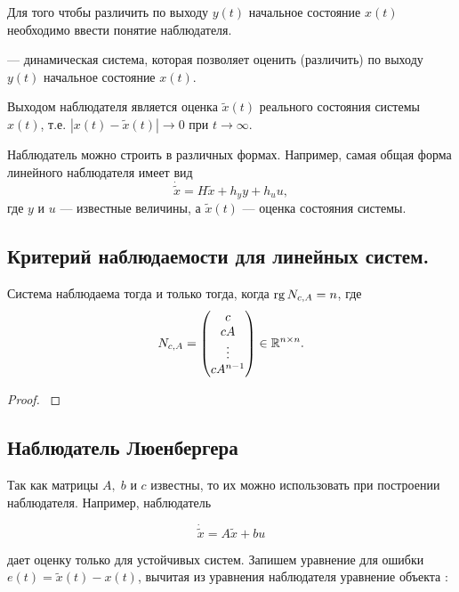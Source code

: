 \documentclass[../../TAU.tex]{subfiles}
\begin{document}
    Для того чтобы различить по выходу $y(t)$ начальное состояние $x(t)$ необходимо ввести понятие наблюдателя.

     --- динамическая система, которая позволяет оценить (различить) по выходу $y(t)$ начальное состояние $x(t)$.

    Выходом наблюдателя является оценка $\tilde x(t)$ реального состояния системы $x(t)$, т.е. $|x(t)-\tilde x(t)|\rightarrow 0$ при $t\rightarrow\infty$.

    Наблюдатель можно строить в различных формах. Например, самая общая форма линейного наблюдателя имеет вид
    $$
    \dot{\tilde x} = H\tilde x + h_y y + h_u u,
    $$
    где $y$ и $u$ --- известные величины, а $\tilde x (t)$ --- оценка состояния системы.

\subsection{Критерий наблюдаемости для линейных систем.}

    \begin{theor}
        Система  наблюдаема тогда и только тогда, когда $\mathop{\mathrm{rg}}\nolimits N_{c,A} = n$, где
        $$
            N_{c,A} =
            \begin{pmatrix}
                c\\
                cA\\
                \vdots\\
                cA^{n-1}
            \end{pmatrix}
            \in\mathbb{R}^{n\times n}.
        $$
    \end{theor}
    
    \begin{proof}
    \cite[стр. 315-318]{voron2}
    \end{proof}

\subsection{Наблюдатель Люенбергера}\cite{andr}

    Так как матрицы $A,\; b$ и $c$ известны, то их можно использовать при построении наблюдателя. Например, наблюдатель

    $$
        \dot{\tilde x} = A\tilde x + bu
    $$

    дает оценку только для устойчивых систем. Запишем уравнение для ошибки $e(t) = \tilde x (t) - x(t)$, вычитая из уравнения наблюдателя уравнение объекта :
\end{document}
